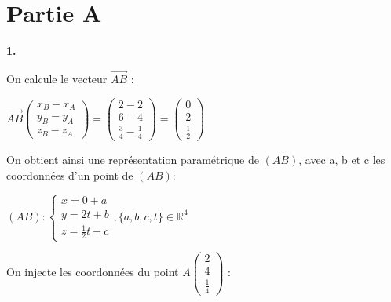 \documentclass{article}
\begin{document}
\iffalse
Énoncé (exercice 2) : 
\href{https://www.sujetdebac.fr/annales-pdf/2019/s-mathematiques-obligatoire-2019-antilles-guyane-sujet-officiel.pdf}{https://www.sujetdebac.fr/annales-pdf/2019/s-mathematiques-obligatoire-2019-antilles-guyane-sujet-officiel.pdf}
\fi

\section{Partie A}

\textbf{1.}

\vspace{2mm}

\noindent On calcule le vecteur $\overrightarrow{AB}$ :

\vspace{2mm}
$\overrightarrow{AB}
\begin{pmatrix}
   x_B-x_A\\
   y_B-y_A\\
   z_B-z_A
\end{pmatrix}
=
\begin{pmatrix}
   2-2\\
   6-4\\
   \frac{3}{4}-\frac{1}{4}
\end{pmatrix}
= 
\begin{pmatrix}
   0\\
   2\\
   \frac{1}{2}
\end{pmatrix}
$
\vspace{2mm}

\noindent On obtient ainsi une représentation paramétrique de $(AB)$, avec a, b et c les coordonnées d'un point de $(AB)$:

\vspace{2mm}

$(AB):\left\{\begin{matrix}
x = 0 + a\\
y = 2t + b \\
z = \frac{1}{2}t + c
\end{matrix}
\right., \{ a, b, c, t \} \in \mathbb{R}^4
$

\vspace{1mm}

\noindent On injecte les coordonnées du point $A\begin{pmatrix}
   2\\
   4\\
   \frac{1}{4}
\end{pmatrix}$ :
\vspace{1mm}
\end{document}
